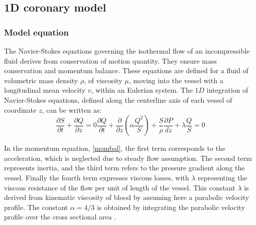 \documentclass[journal]{IEEEtran}
\begin{document}
\subsection{1D coronary model}

\subsubsection{Model equation}

The Navier-Stokes equations governing the isothermal flow of an incompressible fluid derives from conservation of motion quantity. They ensure mass conservation and momentum balance.
These equations are defined for a fluid of volumetric mass density $\rho$, of viscosity $\mu$, moving into the vessel with a longitudinal mean velocity $v$, within an Eulerian system. The $1D$ integration of Navier-Stokes equations, defined along the centerline axis of each vessel of coordinate $z$, can be written as:
\begin{subequations}
 \begin{equation} \label{masscon}
 \frac{\partial S}{\partial t} + \frac{\partial Q}{\partial z} = 0
 \end{equation}

 \begin{equation}\label{mombal}
 \frac{\partial Q}{\partial t} + \frac{\partial}{\partial z} (\alpha \frac{Q^{2}}{S}) + \frac{S}{\rho} \frac{\partial P}{dz} + \lambda \frac{Q}{S} = 0
 \end{equation}
 
 \end{subequations}
 
  
In the momentum equation, \ref{mombal}, the first term corresponds to the acceleration, which is neglected due to steady flow assumption. The second term represents inertia, and the third term refers to the pressure gradient along the vessel. Finally the fourth term expresses viscous losses, with $\lambda$ representing the viscous resistance of the flow per unit of length of the vessel. This constant $\lambda$ is derived from kinematic viscosity of blood by assuming here a parabolic velocity profile. %
The constant $\alpha = 4/3$ is obtained by integrating the parabolic velocity profile over the cross sectional area \cite{vignon2004outflow}. %
\end{document}
